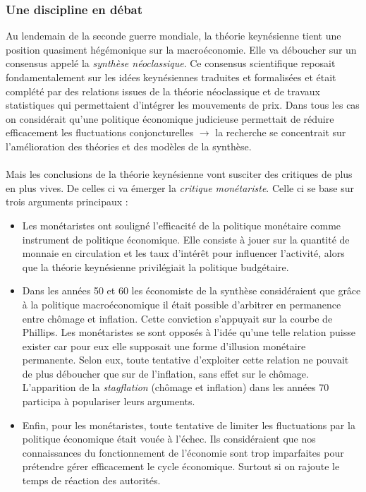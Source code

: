 \documentclass[10pt]{book}
\begin{document}
\subsubsection{Une discipline en débat}
Au lendemain de la seconde guerre mondiale, la théorie keynésienne tient une position quasiment hégémonique sur la macroéconomie. Elle va déboucher sur un consensus appelé la \textit{synthèse néoclassique}. Ce consensus scientifique reposait fondamentalement sur les idées keynésiennes traduites et formalisées et était complété par des relations issues de la théorie néoclassique et de travaux statistiques qui permettaient d'intégrer les mouvements de prix. Dans tous les cas on considérait qu'une politique économique judicieuse permettait de réduire efficacement les fluctuations conjoncturelles $\rightarrow$ la recherche se concentrait sur l'amélioration des théories et des modèles de la synthèse. \\ \\
Mais les conclusions de la théorie keynésienne vont susciter des critiques de plus en plus vives. De celles ci va émerger la \textit{critique monétariste}. Celle ci se base sur trois arguments principaux :
\begin{itemize}
  \item Les monétaristes ont souligné l'efficacité de la politique monétaire comme instrument de politique économique. Elle consiste à jouer sur la quantité de monnaie en circulation et les taux d'intérêt pour influencer l'activité, alors que la théorie keynésienne privilégiait la politique budgétaire.
  \item Dans les années 50 et 60 les économiste de la synthèse considéraient que grâce à la politique macroéconomique il était possible d'arbitrer en permanence entre chômage et inflation. Cette conviction s'appuyait sur la courbe de Phillips. Les monétaristes se sont opposés à l'idée qu'une telle relation puisse exister car pour eux elle supposait une forme d'illusion monétaire permanente. Selon eux, toute tentative d'exploiter cette relation ne pouvait de plus déboucher que sur de l'inflation, sans effet sur le chômage. L'apparition de la \textit{stagflation} (chômage et inflation) dans les années 70 participa à populariser leurs arguments.
  \item Enfin, pour les monétaristes, toute tentative de limiter les fluctuations par la politique économique était vouée à l'échec. Ils considéraient que nos connaissances du fonctionnement de l'économie sont trop imparfaites pour prétendre gérer efficacement le cycle économique. Surtout si on rajoute le temps de réaction des autorités.
\end{itemize}
\end{document}
